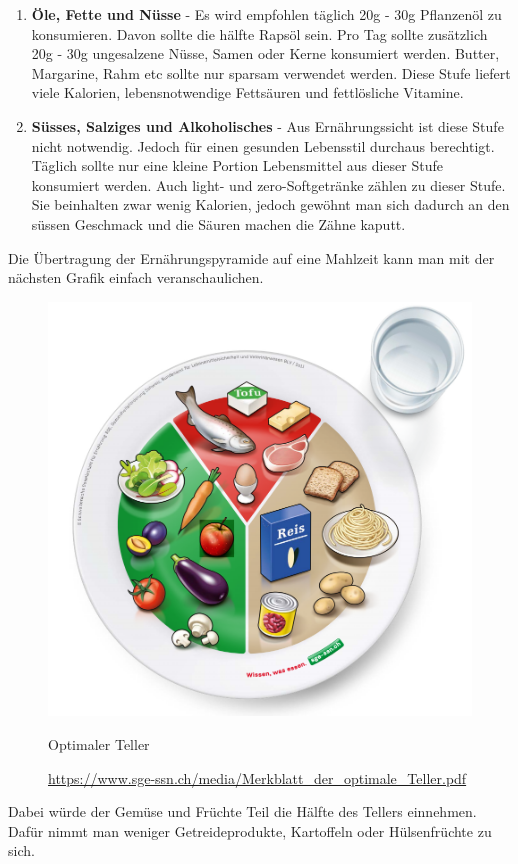 \begin{enumerate}
  \item \textbf{Öle, Fette und Nüsse} - Es wird empfohlen täglich 20g - 30g Pflanzenöl zu konsumieren. Davon sollte die hälfte Rapsöl sein. Pro Tag sollte zusätzlich 20g - 30g ungesalzene Nüsse, Samen oder Kerne konsumiert werden.
  \newline
  Butter, Margarine, Rahm etc sollte nur sparsam verwendet werden.
  \newline
  Diese Stufe liefert viele Kalorien, lebensnotwendige Fettsäuren und fettlösliche Vitamine. \cite{stufe_le_fette_nuesse}
  \item \textbf{Süsses, Salziges und Alkoholisches} - Aus Ernährungssicht ist diese Stufe nicht notwendig. Jedoch für einen gesunden Lebensstil durchaus berechtigt.
  \newline
  Täglich sollte nur eine kleine Portion Lebensmittel aus dieser Stufe konsumiert werden.
  \newline
  Auch light- und zero-Softgetränke zählen zu dieser Stufe. Sie beinhalten zwar wenig Kalorien, jedoch gewöhnt man sich dadurch an den süssen Geschmack und die Säuren machen die Zähne kaputt. \cite{stufe_suesses_salziges_alkoholisches}
\end{enumerate}
Die Übertragung der Ernährungspyramide auf eine Mahlzeit kann man mit der nächsten Grafik einfach veranschaulichen.
\begin{figure}[!ht]
  \centering
  \includegraphics[width=0.5\linewidth]{./images/der_perfekte_teller.png}
  \caption{Optimaler Teller}
  \label{fig:teller}
  \caption*{\url{https://www.sge-ssn.ch/media/Merkblatt_der_optimale_Teller.pdf}}
\end{figure}
Dabei würde der Gemüse und Früchte Teil die Hälfte des Tellers einnehmen. Dafür nimmt man weniger Getreideprodukte, Kartoffeln oder Hülsenfrüchte zu sich.
